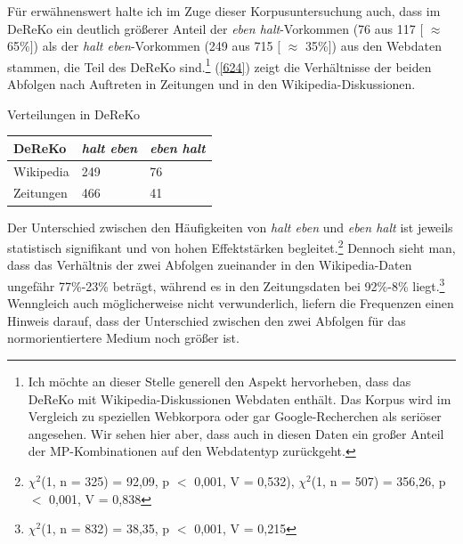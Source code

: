 \begin{exe}
\end{exe}
Für erwähnenswert halte ich im Zuge dieser Korpusuntersuchung auch, dass im DeReKo ein deutlich größerer Anteil der \textit{eben halt}-Vorkommen (76 aus 117 $[$ $\approx$ 65\%$]$) als der \textit{halt eben}-Vorkommen (249 aus 715 $[$ $\approx$ 35\%$]$) aus den Webdaten stammen, die Teil des DeReKo sind.\footnote{Ich möchte an dieser Stelle generell den Aspekt hervorheben, dass das DeReKo mit Wikipedia-Diskussionen Webdaten enthält. Das Korpus wird im Vergleich zu speziellen Webkorpora oder gar Google-Recherchen als seriöser angesehen. Wir sehen hier aber, dass auch in diesen Daten ein großer Anteil der MP-Kombinationen auf den Webdatentyp zurückgeht.} (\ref{624}) zeigt die Verhältnisse der beiden Abfolgen nach Auftreten in Zeitungen und in den Wikipedia-Diskussionen.

\begin{exe}
	\ex\label{624} Verteilungen in DeReKo\\[-1em]
     \begin{tabular}[t]{|l|l|l|}
     \hline
     DeReKo & \textit{halt eben} & \textit{eben halt}\\
     \hline
     Wikipedia & 249 & 76\\
     \hline
     Zeitungen & 466 & 41\\
     \hline
     \end{tabular}
\end{exe}
Der Unterschied zwischen den Häufigkeiten von \textit{halt eben} und \textit{eben halt} ist je\-weils statistisch signifikant und von hohen Effektstärken begleitet.\footnote{$\chi^2$(1, n = 325) = 92,09, p $<$ 0,001, V = 0,532), $\chi^2$(1, n = 507) = 356,26, p $<$ 0,001, V = 0,838} Dennoch sieht man, dass das Verhältnis der zwei Abfolgen zueinander in den Wikipedia-Daten ungefähr 77\%-23\% beträgt, während es in den Zeitungsdaten bei 92\%-8\% liegt.\footnote{$\chi^2$(1, n = 832) = 38,35, p $<$ 0,001, V = 0,215} Wenngleich auch möglicherweise nicht verwunderlich, liefern die Frequenzen einen Hinweis darauf, dass der Unterschied zwischen den zwei Abfolgen für das normorientiertere Medium noch größer ist.


